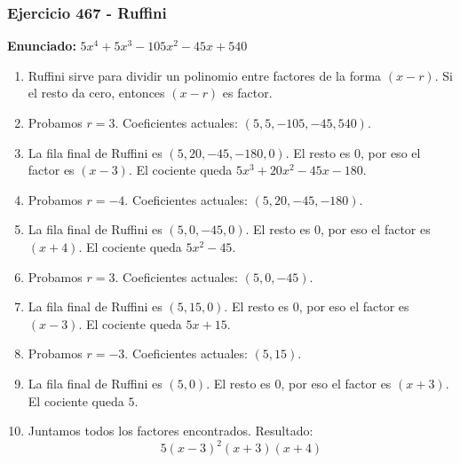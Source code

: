 \documentclass[11pt,a4paper]{article}
\begin{document}
\subsubsection*{Ejercicio 467 - Ruffini}
\textbf{Enunciado:} $ 5 x^{4} + 5 x^{3} - 105 x^{2} - 45 x + 540 $\par
\begin{enumerate}[leftmargin=2em]
\item Ruffini sirve para dividir un polinomio entre factores de la forma \((x-r)\). Si el resto da cero, entonces \((x-r)\) es factor.
\item Probamos \(r=3\). Coeficientes actuales: \((5, 5, -105, -45, 540)\).
\item La fila final de Ruffini es \((5, 20, -45, -180, 0)\). El resto es \(0\), por eso el factor es \((x-3)\). El cociente queda \(5 x^{3} + 20 x^{2} - 45 x - 180\).
\item Probamos \(r=-4\). Coeficientes actuales: \((5, 20, -45, -180)\).
\item La fila final de Ruffini es \((5, 0, -45, 0)\). El resto es \(0\), por eso el factor es \((x+4)\). El cociente queda \(5 x^{2} - 45\).
\item Probamos \(r=3\). Coeficientes actuales: \((5, 0, -45)\).
\item La fila final de Ruffini es \((5, 15, 0)\). El resto es \(0\), por eso el factor es \((x-3)\). El cociente queda \(5 x + 15\).
\item Probamos \(r=-3\). Coeficientes actuales: \((5, 15)\).
\item La fila final de Ruffini es \((5, 0)\). El resto es \(0\), por eso el factor es \((x+3)\). El cociente queda \(5\).
\item Juntamos todos los factores encontrados. Resultado: \[\boxed{5 \left(x - 3\right)^{2} \left(x + 3\right) \left(x + 4\right)}\]
\end{enumerate}

\vspace{0.2cm}
\end{document}
